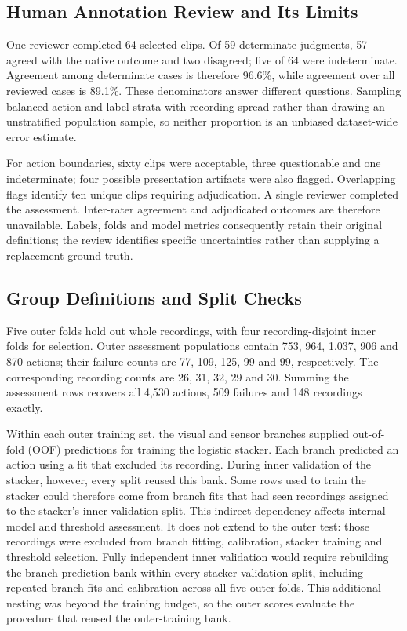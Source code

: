 \subsection{Human Annotation Review and Its Limits}
One reviewer completed 64 selected clips. Of 59 determinate judgments, 57 agreed with
the native outcome and two disagreed; five of 64 were indeterminate. Agreement among
determinate cases is therefore 96.6\%, while agreement over all reviewed cases is
89.1\%. These denominators answer different questions. Sampling balanced action and
label strata with recording spread rather than drawing an unstratified population
sample, so neither proportion is an unbiased dataset-wide error estimate.

For action boundaries, sixty clips were acceptable, three questionable and one
indeterminate; four possible presentation artifacts were also flagged. Overlapping flags
identify ten unique clips requiring adjudication. A single reviewer completed the
assessment. Inter-rater agreement and adjudicated outcomes are therefore unavailable.
Labels, folds and model metrics consequently retain their original definitions; the
review identifies specific uncertainties rather than supplying a replacement ground
truth.

\subsection{Group Definitions and Split Checks}
Five outer folds hold out whole recordings, with four recording-disjoint inner folds for
selection. Outer assessment populations contain 753, 964, 1,037, 906 and 870 actions;
their failure counts are 77, 109, 125, 99 and 99, respectively. The corresponding
recording counts are 26, 31, 32, 29 and 30. Summing the assessment rows recovers all
4,530 actions, 509 failures and 148 recordings exactly.

Within each outer training set, the visual and sensor branches supplied out-of-fold
(OOF) predictions for training the logistic stacker. Each branch predicted an action
using a fit that excluded its recording. During inner validation of the stacker,
however, every split reused this bank. Some rows used to train the stacker could
therefore come from branch fits that had seen recordings assigned to the stacker's inner
validation split. This indirect dependency affects internal model and threshold
assessment. It does not extend to the outer test: those recordings were excluded from
branch fitting, calibration, stacker training and threshold selection. Fully independent
inner validation would require rebuilding the branch prediction bank within every
stacker-validation split, including repeated branch fits and calibration across all five
outer folds. This additional nesting was beyond the training budget, so the outer scores
evaluate the procedure that reused the outer-training bank.

